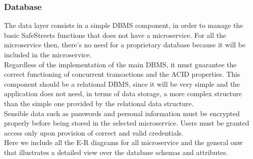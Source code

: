 \subsubsection{Database}
The data layer consists in a simple DBMS component, in order to manage the basic SafeStreets functions that does not have a microservice. For all the microservice then, there's no need for a proprietary database because it will be included in the microservice.
\\Regardless of the implementation of the main DBMS, it must guarantee the correct functioning of concurrent transactions and the ACID properties.
This component should be a relational DBMS, since it will be very simple and the application does not need, in terms of data storage, a more complex structure than the simple one provided by the relational data structure.\\
Sensible data such as passwords and personal information must be encrypted properly before being stored in the selected microservice. Users must be granted access only upon provision of correct and valid credentials.\\
Here we include all the E-R diagrams for all microservice and the general onw that illustrates a detailed view over the database schemas and attributes.

